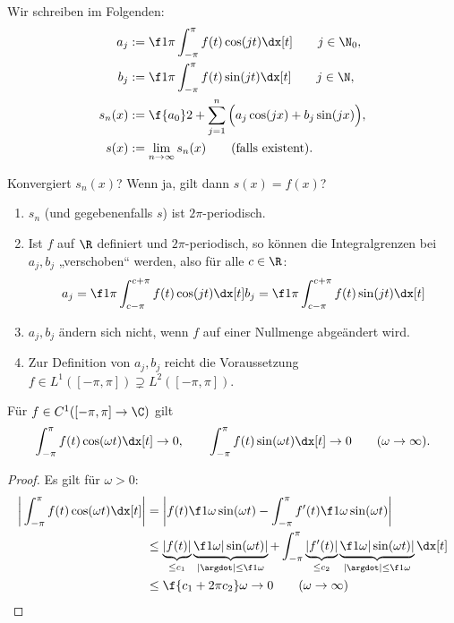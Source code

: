 \begin{nt}[Notation] \label{3.21}
	Wir schreiben im Folgenden:
	\begin{align*}
		a_j &:= \f 1{\pi} \int_{-\pi}^{\pi} f(t) \cos(jt) \dx[t] \qquad j\in \N_0, \\
		b_j &:= \f 1{\pi} \int_{-\pi}^{\pi} f(t) \sin(jt) \dx[t] \qquad j\in \N, \\
		s_n(x) &:= \f {a_0}2 + \sum_{j=1}^n \Big( a_j \cos(jx) + b_j \sin(jx) \Big), \\
		s(x) &:= \lim_{n\to \infty} s_n(x) \qquad \text{(falls existent)}.
	\end{align*}
\end{nt}

Konvergiert $s_n(x)$? Wenn ja, gilt dann $s(x) = f(x)$?

\begin{nt}[Beobachtungen] \label{3.22}
	\begin{enumerate}[1)]
		\item
			$s_n$ (und gegebenenfalls $s$) ist $2\pi$-periodisch.
		\item
			Ist $f$ auf $\R$ definiert und $2\pi$-periodisch, so können die Integralgrenzen bei $a_j, b_j$ „verschoben“ werden, also für alle $c \in \R$:
			\begin{align*}
				a_j = \f 1{\pi} \int_{c-\pi}^{c+\pi} f(t) \cos(jt) \dx[t]
				b_j = \f 1{\pi} \int_{c-\pi}^{c+\pi} f(t) \sin(jt) \dx[t]
			\end{align*}
		\item
			$a_j, b_j$ ändern sich nicht, wenn $f$ auf einer Nullmenge abgeändert wird.
		\item
			Zur Definition von $a_j, b_j$ reicht die Voraussetzung $f \in L^1([-\pi, \pi]) \supsetneq L^2([-\pi, \pi])$.
	\end{enumerate}
\end{nt}

\begin{lem} \label{3.23}
	Für $f \in C^1([-\pi, \pi] \to \C)$ gilt
	\[
		\int_{-\pi}^{\pi} f(t) \cos(\omega t) \dx[t] \to 0, \qquad
		\int_{-\pi}^{\pi} f(t) \sin(\omega t) \dx[t] \to 0 \qquad (\omega \to \infty).
	\]
	\begin{proof}
		Es gilt für $\omega > 0$:
		\begin{align*}
			\bigg| \int_{-\pi}^{\pi} f(t) \cos(\omega t) \dx[t] \bigg|
			&= \bigg| f(t) \f 1{\omega} \sin(\omega t) - \int_{-\pi}^{\pi} f'(t) \f 1{\omega} \sin(\omega t) \bigg| \\
			&\le \underbrace{|f(t)|}_{\le c_1} \underbrace{\f 1{\omega} |\sin(\omega t)|}_{|\argdot| \le \f 1{\omega}} + \int_{-\pi}^{\pi} \underbrace{|f'(t)|}_{\le c_2} \underbrace{\f 1{\omega} |\sin(\omega t)|}_{|\argdot|\le \f 1{\omega}} \dx[t] \\
			&\le \f {c_1 + 2\pi c_2}\omega \to 0 \qquad (\omega \to \infty)
		\end{align*}
	\end{proof}
\end{lem}

